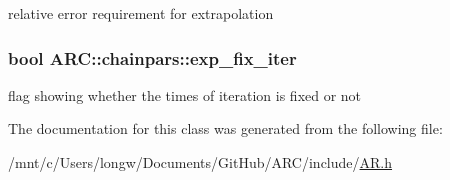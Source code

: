 relative error requirement for extrapolation 

\subsubsection[{\texorpdfstring{exp\+\_\+fix\+\_\+iter}{exp_fix_iter}}]{\setlength{\rightskip}{0pt plus 5cm}bool A\+R\+C\+::chainpars\+::exp\+\_\+fix\+\_\+iter}\hypertarget{classARC_1_1chainpars_a3f16e6ea9497e294265c4a17df0394ba}{}\label{classARC_1_1chainpars_a3f16e6ea9497e294265c4a17df0394ba}


flag showing whether the times of iteration is fixed or not 



The documentation for this class was generated from the following file\+:\begin{DoxyCompactItemize}
\item 
/mnt/c/\+Users/longw/\+Documents/\+Git\+Hub/\+A\+R\+C/include/\hyperlink{AR_8h}{A\+R.\+h}\end{DoxyCompactItemize}
